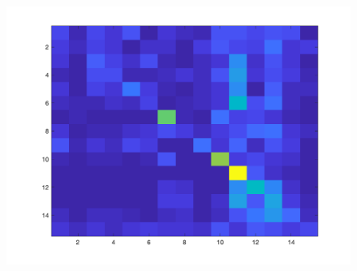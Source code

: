 \documentclass[letter, 11pt]{article}
\begin{document}
\begin{figure}[h]
    \endminipage\hfill
        \centering
        \includegraphics[width=\textwidth]{HW3/RESULT/ClassifyKNN_Tiny_confusion.png}
    \endminipage\hfill
\end{figure}
\end{document}
